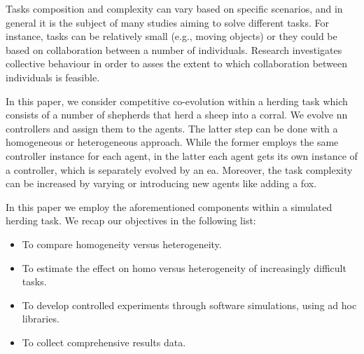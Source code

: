 \documentclass[conference]{IEEEtran}
\begin{document}
Tasks composition and complexity can vary based on specific scenarios, and in general it is the subject of many studies aiming to solve different tasks.
For instance, tasks can be relatively small (e.g., moving objects) or they could be based on collaboration between a number of individuals.
Research investigates collective behaviour in order to asses the extent to which collaboration between individuals is feasible.

In this paper, we consider competitive co-evolution within a herding task which consists of a number of shepherds that herd a sheep into a corral.
We evolve \gls{nn} controllers and assign them to the agents. The latter step can be done with a homogeneous or heterogeneous approach.
While the former employs the same controller instance for each agent,
in the latter each agent gets its own instance of a controller, which is separately evolved by an \gls{ea}.
Moreover, the task complexity can be increased by varying or introducing new agents like adding a fox.

In this paper we employ the aforementioned components within a simulated herding task.
We recap our objectives in the following list:

\begin{itemize}
	\item To compare homogeneity versus heterogeneity.
	\item To estimate the effect on homo versus heterogeneity of increasingly difficult tasks.
 	\item To develop controlled experiments through software simulations, using ad hoc libraries.
	\item To collect comprehensive results data.
\end{itemize}
 
\end{document}
